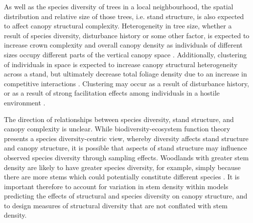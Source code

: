 \documentclass[11pt,a4paper]{article}
\begin{document}
As well as the species diversity of trees in a local neighbourhood, the spatial distribution and relative size of those trees, i.e. stand structure, is also expected to affect canopy structural complexity. Heterogeneity in tree size, whether a result of species diversity, disturbance history or some other factor, is expected to increase crown complexity and overall canopy density as individuals of different sizes occupy different parts of the vertical canopy space \citep{}. Additionally, clustering of individuals in space is expected to increase canopy structural heterogeneity across a stand, but ultimately decrease total foliage density due to an increase in competitive interactions \citep{}. Clustering may occur as a result of disturbance history, or as a result of strong facilitation effects among individuals in a hostile environment \citep{Ratcliffe2017}.

The direction of relationships between species diversity, stand structure, and canopy complexity is unclear. While biodiversity-ecosystem function theory presents a species diversity-centric view, whereby diversity affects stand structure and canopy structure, it is possible that aspects of stand structure may influence observed species diversity through sampling effects. Woodlands with greater stem density are likely to have greater species diversity, for example, simply because there are more stems which could potentially constitute different species \citep{}. It is important therefore to account for variation in stem density within models predicting the effects of structural and species diversity on canopy structure, and to design measures of structural diversity that are not conflated with stem density.
\end{document}
